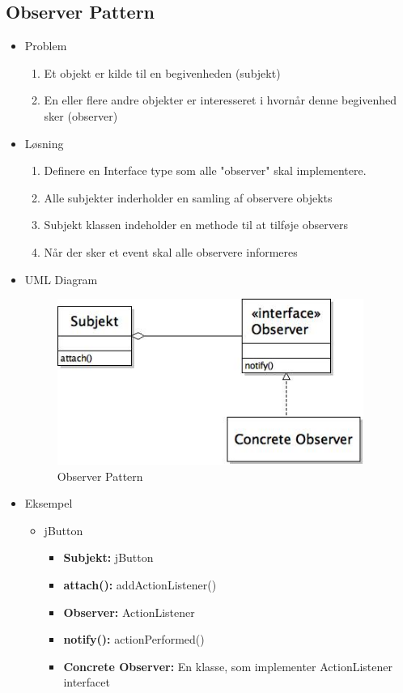 \documentclass{article}
\begin{document}
\subsection{Observer Pattern}
\begin{itemize}
	\item Problem
	\begin{enumerate}
		\item Et objekt er kilde til en begivenheden (subjekt)
		\item En eller flere andre objekter er interesseret i hvornår denne begivenhed sker (observer)
	\end{enumerate}
	\item Løsning
	\begin{enumerate}
		\item Definere en Interface type som alle "observer" skal implementere. 
		\item Alle subjekter inderholder en samling af observere objekts 
		\item Subjekt klassen indeholder en methode til at tilføje observers
		\item Når der sker et event skal alle observere informeres
	\end{enumerate}
	\item UML Diagram
	\begin{figure}[ht!]
		\centering
		\includegraphics[width=100mm]{img/observerUML.jpeg}
		\caption{Observer Pattern  \label{UMLDesign2}}
	\end{figure}
	\item Eksempel
	\begin{itemize}
		\item jButton
		\begin{itemize}
			\item \textbf{Subjekt:} jButton
			\item \textbf{attach():} addActionListener()
			\item \textbf{Observer:} ActionListener 
			\item \textbf{notify():} actionPerformed()
			\item \textbf{Concrete Observer:} En klasse, som implementer ActionListener interfacet 
		\end{itemize}
	\end{itemize}
\end{itemize}
\end{document}

